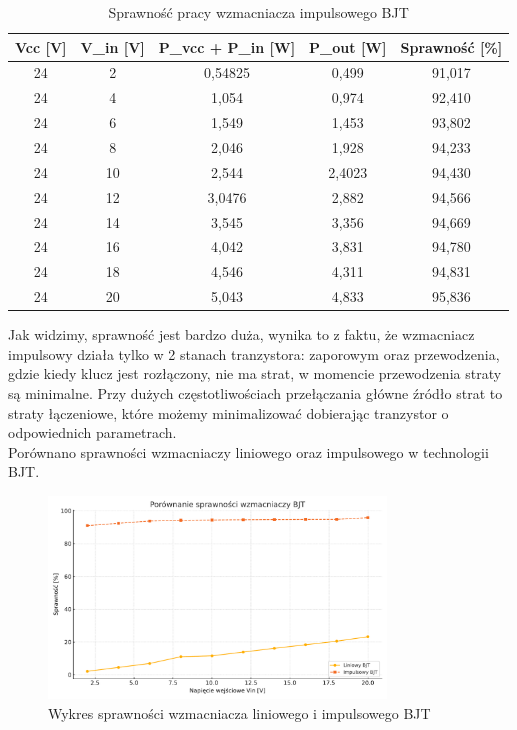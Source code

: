 \documentclass[11pt]{article}
\begin{document}
\begin{table}[H]
\centering
\begin{tabular}{|c|c|c|c|c|}
\hline
\textbf{Vcc [V]} & \textbf{V\_in [V]} & \textbf{P\_vcc + P\_in [W]} & \textbf{P\_out [W]} & \textbf{Sprawność [\%]} \\
\hline
24 & 2  & 0{,}54825 & 0{,}499   & 91{,}017 \\
\hline
24 & 4  & 1{,}054   & 0{,}974   & 92{,}410 \\
\hline
24 & 6  & 1{,}549   & 1{,}453   & 93{,}802 \\
\hline
24 & 8  & 2{,}046   & 1{,}928   & 94{,}233 \\
\hline
24 & 10 & 2{,}544   & 2{,}4023  & 94{,}430 \\
\hline
24 & 12 & 3{,}0476  & 2{,}882   & 94{,}566 \\
\hline
24 & 14 & 3{,}545   & 3{,}356   & 94{,}669 \\
\hline
24 & 16 & 4{,}042   & 3{,}831   & 94{,}780 \\
\hline
24 & 18 & 4{,}546   & 4{,}311   & 94{,}831 \\
\hline
24 & 20 & 5{,}043   & 4{,}833   & 95{,}836 \\
\hline
\end{tabular}
\caption{Sprawność pracy wzmacniacza impulsowego BJT}
\end{table}

Jak widzimy, sprawność jest bardzo duża, wynika to z faktu, że wzmacniacz impulsowy działa tylko w 2 stanach tranzystora:
zaporowym oraz przewodzenia, gdzie kiedy klucz jest rozłączony, nie ma strat, w momencie przewodzenia straty są minimalne. Przy dużych częstotliwościach przełączania główne źródło strat to straty łączeniowe, które możemy minimalizować dobierając tranzystor o odpowiednich parametrach.\\

Porównano sprawności wzmacniaczy liniowego oraz impulsowego w technologii BJT.\\

\begin{figure}[H]
\centering
\includegraphics[width=0.8\textwidth]{aun1_liniowy_impulsowy_bjt.pdf}
\caption{Wykres sprawności wzmacniacza liniowego i impulsowego BJT}
\end{figure}
\end{document}
